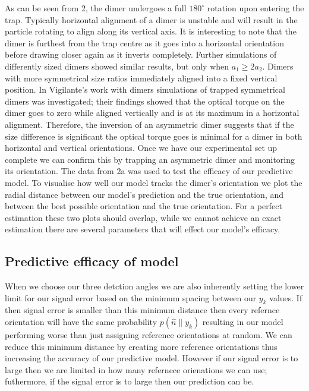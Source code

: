 \documentclass[preprint,3p]{elsarticle}
\begin{document}
As can be seen from \figurename{ 2}, the dimer undergoes a full $180^{\circ}$ rotation upon entering the trap. Typically horizontal alignment of a dimer is unstable and will result in the particle rotating to align along its vertical axis. It is interesting to note that the dimer is furthest from the trap centre as it goes into a horizontal orientation before drawing closer again as it inverts completely. Further simulations of differently sized dimers showed similar results, but only when $a_1 \geq 2a_2$. Dimers with more symmetrical size ratios immediately aligned into a fixed vertical position. 
In Vigilante's work with dimers \cite{Vigilante2020Brownian_OT} simulations of trapped symmetrical dimers was investigated; their findings showed that the optical torque on the dimer goes to zero while aligned vertically and is at its maximum in a horizontal alignment. Therefore, the inversion of an asymmetric dimer suggests that if the size difference is significant the optical torque goes is minimal for a dimer in both horizontal and vertical orientations. Once we have our experimental set up complete we can confirm this by trapping an asymmetric dimer and monitoring its orientation. The data from \figurename{ 2a} was used to test the efficacy of our predictive model. To visualise how well our model tracks the dimer's orientation we plot the radial distance between our model's prediction and the true orientation, and between the best possible orientation and the true orientation. For a perfect estimation these two plots should overlap, while  we cannot achieve an exact estimation there are several parameters that will effect our model's efficacy. 

\newpage
\subsection{Predictive efficacy of model}
\label{sec:3.2}
When we choose our three detction angles we are also inherently setting the lower limit for our signal error based on the minimum spacing between our $y_k$ values. If then signal error is smaller than this minimum distance then every refernce orientation will have the same probability $p(\hat{n} \parallel y_k)$ resulting in our model performing worse than just assigning reference orientations at random. We can reduce this minimum distance by creating more reference orientations thus increasing the accuracy of our predictive model. However if our signal error is to large then we are limited in how many refernece orienations we can use; futhermore, if the signal error is to large then our prediction can be. 
\end{document}
